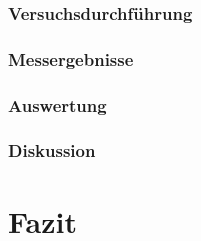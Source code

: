\documentclass[12pt,a4paper]{article}
\begin{document}
\subsubsection*{Versuchsdurchführung}
\subsubsection*{Messergebnisse}
\subsubsection*{Auswertung}
\subsubsection*{Diskussion}

\section{Fazit}
\end{document}
